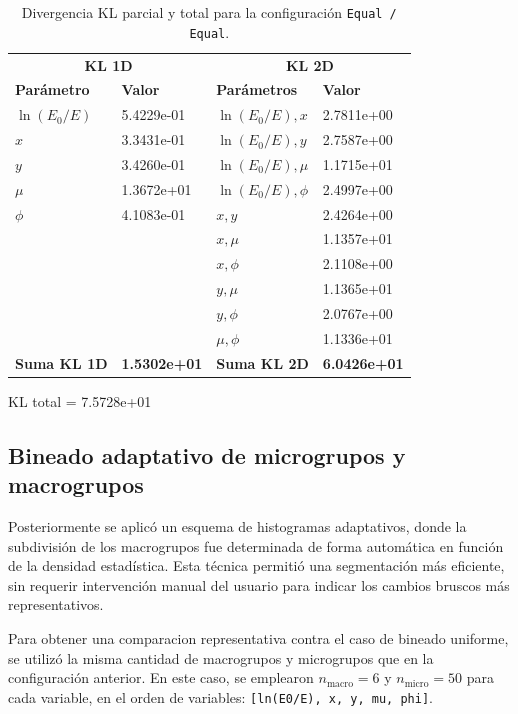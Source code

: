 \begin{table}[H]
    \centering
    \caption{Divergencia KL parcial y total para la configuración \texttt{Equal / Equal}.}
    \label{tab:KL_KL_parciales_equal_columns_manual}
    \begin{tabular}{ll@{\hspace{2cm}}ll}
    \toprule
    \multicolumn{2}{c}{\textbf{KL 1D}} & \multicolumn{2}{c}{\textbf{KL 2D}} \\
    \cmidrule(lr){1-2} \cmidrule(lr){3-4}
    \textbf{Parámetro} & \textbf{Valor} & \textbf{Parámetros} & \textbf{Valor} \\
    \midrule
    $\ln(E_0/E)$ & 5.4229e-01 & $\ln(E_0/E), x$ & 2.7811e+00 \\
    $x$ & 3.3431e-01 & $\ln(E_0/E), y$ & 2.7587e+00 \\
    $y$ & 3.4260e-01 & $\ln(E_0/E), \mu$ & 1.1715e+01 \\
    $\mu$ & 1.3672e+01 & $\ln(E_0/E), \phi$ & 2.4997e+00 \\
    $\phi$ & 4.1083e-01 & $x, y$ & 2.4264e+00 \\
    & & $x, \mu$ & 1.1357e+01 \\
    & & $x, \phi$ & 2.1108e+00 \\
    & & $y, \mu$ & 1.1365e+01 \\
    & & $y, \phi$ & 2.0767e+00 \\
    & & $\mu, \phi$ & 1.1336e+01 \\
    \midrule
    \textbf{Suma KL 1D} & \textbf{1.5302e+01} & \textbf{Suma KL 2D} & \textbf{6.0426e+01} \\
    \bottomrule
    \end{tabular}
    \vspace{0.5em}
    
    KL total = 7.5728e+01
\end{table}

\subsection{Bineado adaptativo de microgrupos y macrogrupos}

Posteriormente se aplicó un esquema de histogramas adaptativos, donde la subdivisión de los macrogrupos fue determinada de forma automática en función de la densidad estadística. Esta técnica permitió una segmentación más eficiente, sin requerir intervención manual del usuario para indicar los cambios bruscos más representativos.

Para obtener una comparacion representativa contra el caso de bineado uniforme, se utilizó la misma cantidad de macrogrupos y microgrupos que en la configuración anterior. En este caso, se emplearon $n_{\text{macro}} = 6$ y $n_{\text{micro}} = 50$ para cada variable, en el orden de variables: \texttt{[ln(E0/E), x, y, mu, phi]}.

